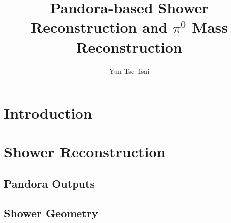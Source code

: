 \documentclass[12pt, oneside]{article}   	%
\title{Pandora-based Shower Reconstruction and $\pi^0$ Mass Reconstruction}
\author{Yun-Tse Tsai}
\date{}
\begin{document}
\maketitle

\section{Introduction}

\section{Shower Reconstruction}
\subsection{Pandora Outputs}
\subsection{Shower Geometry}
\end{document}
